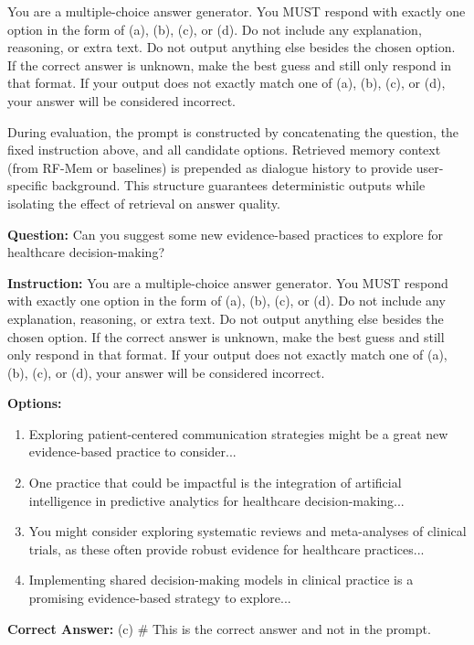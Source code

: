 \begin{tcolorbox}[colback=gray!5,colframe=gray!40!black,title=Prompt Instruction]
\small
You are a multiple-choice answer generator. You MUST respond with exactly one option in the form of (a), (b), (c), or (d).  
Do not include any explanation, reasoning, or extra text.  
Do not output anything else besides the chosen option.  
If the correct answer is unknown, make the best guess and still only respond in that format.  
If your output does not exactly match one of (a), (b), (c), or (d), your answer will be considered incorrect.
\end{tcolorbox}

During evaluation, the prompt is constructed by concatenating the question, the fixed instruction above, and all candidate options. Retrieved memory context (from RF-Mem or baselines) is prepended as dialogue history to provide user-specific background. This structure guarantees deterministic outputs while isolating the effect of retrieval on answer quality.

\begin{tcolorbox}[colback=gray!1,colframe=gray!10!black,title=Example Prompt, fonttitle=\bfseries]
\textbf{Question:} Can you suggest some new evidence-based practices to explore for healthcare decision-making?

\textbf{Instruction:} You are a multiple-choice answer generator. You MUST respond with exactly one option in the form of (a), (b), (c), or (d). Do not include any explanation, reasoning, or extra text. Do not output anything else besides the chosen option. If the correct answer is unknown, make the best guess and still only respond in that format. If your output does not exactly match one of (a), (b), (c), or (d), your answer will be considered incorrect.

\textbf{Options:}
\begin{enumerate}[label=(\alph*)]
    \item Exploring patient-centered communication strategies might be a great new evidence-based practice to consider...
    \item One practice that could be impactful is the integration of artificial intelligence in predictive analytics for healthcare decision-making...
    \item You might consider exploring systematic reviews and meta-analyses of clinical trials, as these often provide robust evidence for healthcare practices...
    \item Implementing shared decision-making models in clinical practice is a promising evidence-based strategy to explore...
\end{enumerate}

\noindent\textcolor{gray!60!black}{\textbf{Correct Answer:} (c) \# This is the correct answer and not in the prompt.}
\end{tcolorbox}



